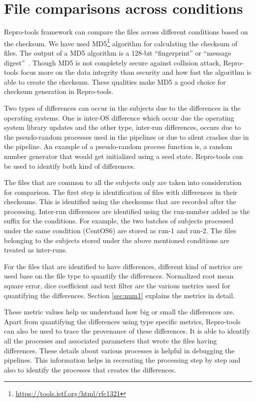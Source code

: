 \section{File comparisons across conditions}\label{file_analysis}
Repro-tools framework can compare the files across different conditions based on the checksum. We have used MD5\footnote{\url{https://tools.ietf.org/html/rfc1321}} algorithm for calculating the checksum of files. The output of a MD5 algorithm is a 128-bit ``fingerprint'' or ``message digest''~\cite{md5}. Though MD5 is not completely secure against collision attack, Repro-tools focus more on the data integrity than security and how fast the algorithm is able to create the checksum. These qualities make MD5 a good choice for checksum generation in Repro-tools.

Two types of differences can occur in the subjects due to the differences in the operating systems. One is inter-OS difference which occur due the operating system library updates and the other type, inter-run differences, occurs due to the pseudo-random processes used in the pipelines or due to silent crashes due in the pipeline. An example of a pseudo-random process function is, a random number generator that would get initialized using a seed state. Repro-tools can be used to identify both kind of differences.

The files that are common to all the subjects only are taken into consideration for comparison. The first step is identification of files with differences in their checksums. This is identified using the checksums that are recorded after the processing. Inter-run differences are identified using the run-number added as the suffix for the conditions. For example, the two batches of subjects processed under the same condition (CentOS6) are stored as run-1 and run-2. The files belonging to the subjects stored under the above mentioned conditions are treated as inter-runs.

For the files that are identified to have differences, different kind of metrics are used base on the file type to quantify the differences. Normalized root mean square error, dice coefficient and text filter are the various metrics used for quantifying the differences. Section \ref{sec:num1} explains the metrics in detail. 

These metric values help us understand how big or small the differences are. Apart from quantifying the differences using type specific metrics, Repro-tools can also be used to trace the provenance of these differences. It is able to identify all the processes and associated parameters that wrote the files having differences. These details about various processes is helpful in debugging the pipelines. This information helps in recreating the processing step by step and also to identify the processes that creates the differences.

